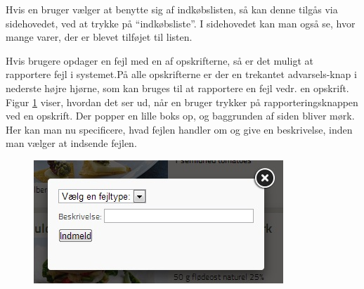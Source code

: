 Hvis en bruger vælger at benytte sig af indkøbslisten, så kan denne tilgås via sidehovedet, ved at trykke på ``indkøbsliste''. I sidehovedet kan man også se, hvor mange varer, der er blevet tilføjet til listen.

Hvis brugere opdager en fejl med en af opskrifterne, så er det muligt at rapportere fejl i systemet.På alle opskrifterne er der en trekantet advarsels-knap i nederste højre hjørne, som kan bruges til at rapportere en fejl vedr. en opskrift. Figur \ref{fig:foodl-fejlrapportering} viser, hvordan det ser ud, når en bruger trykker på rapporteringsknappen ved en opskrift. Der popper en lille boks op, og baggrunden af siden bliver mørk. Her kan man nu specificere, hvad fejlen handler om og give en beskrivelse, inden man vælger at indsende fejlen.

\begin{figure}[H]
	\centering
	\includegraphics[scale=0.7]{billeder/foodl/fejlrapportering.jpg}
	\label{fig:foodl-fejlrapportering}
\end{figure}

